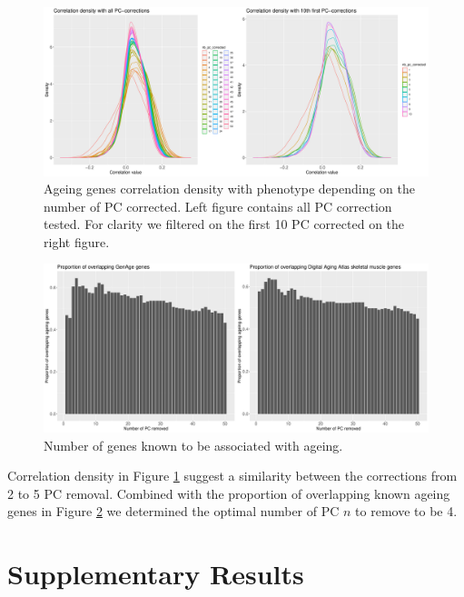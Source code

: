 \begin{figure}[ht]
    \includegraphics[width=\textwidth, center]{img/annexe_add_file_GWENA/additional_file_figure_2.pdf}
    \caption{Ageing genes correlation density with phenotype depending on the number of PC corrected. Left figure contains all PC correction tested. For clarity we filtered on the first 10 PC corrected on the right figure.}
    \label{fig:supp_fig_ageing_correlation_density}
\end{figure}

\begin{figure}[ht]
    \includegraphics[width=\textwidth, center]{img/annexe_add_file_GWENA/additional_file_figure_3.pdf}
    \caption{Number of genes known to be associated with ageing.}
    \label{fig:supp_fig_ageing_genes_overlapping}
\end{figure}

Correlation density in Figure \ref{fig:supp_fig_ageing_correlation_density} suggest a similarity between the corrections from 2 to 5 PC removal. Combined with the proportion of overlapping known ageing genes in Figure \ref{fig:supp_fig_ageing_genes_overlapping} we determined the optimal number of PC $n$ to remove to be 4.

\clearpage
\section{Supplementary Results}
